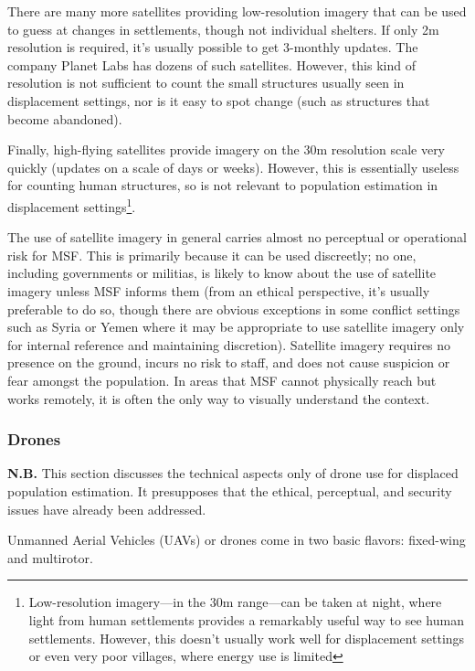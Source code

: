 \documentclass[a4paper,12pt,twoside]{article}
\begin{document}
There are many more satellites providing low-resolution imagery that can be used to guess at changes in settlements, though not individual shelters. If only 2m resolution is required, it's usually possible to get 3-monthly updates. The company Planet Labs has dozens of such satellites. However, this kind of resolution is not sufficient to count the small structures usually seen in displacement settings, nor is it easy to spot change (such as structures that become abandoned).

Finally, high-flying satellites provide imagery on the 30m resolution scale very quickly (updates on a scale of days or weeks). However, this is essentially useless for counting human structures, so is not relevant to population estimation in displacement settings\footnote{Low-resolution imagery---in the 30m range---can be taken at night, where light from human settlements provides a remarkably useful way to see human settlements. However, this doesn't usually work well for displacement settings or even very poor villages, where energy use is limited}. 

The use of satellite imagery in general carries almost no perceptual or operational risk for MSF. This is primarily because it can be used discreetly; no one, including governments or militias, is likely to know about the use of satellite imagery unless MSF informs them (from an ethical perspective, it's usually preferable to do so, though there are obvious exceptions in some conflict settings such as Syria or Yemen where it may be appropriate to use satellite imagery only for internal reference and maintaining discretion). Satellite imagery requires no presence on the ground, incurs no risk to staff, and does not cause suspicion or fear amongst the population. In areas that MSF cannot physically reach but works remotely, it is often the only way to visually understand the context.

\subsubsection{Drones}
\textbf{N.B.} This section discusses the technical aspects only of drone use for displaced population estimation. It presupposes that the ethical, perceptual, and security issues have already been addressed. 

Unmanned Aerial Vehicles (UAVs) or drones come in two basic flavors: fixed-wing and multirotor. 
\end{document}
